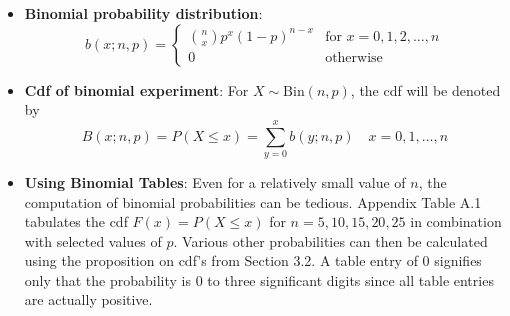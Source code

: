 \documentclass{report}
\begin{document}
\begin{itemize}
    \item \textbf{Binomial probability distribution}:
        \[
            b(x; n, p) =
            \begin{cases} 
                \binom{n}{x} p^x (1 - p)^{n - x} & \text{for } x = 0, 1, 2, \ldots, n \\
                0 & \text{otherwise}
            \end{cases}
        \]
    \item \textbf{Cdf of binomial experiment}:
        For \( X \sim \text{Bin}(n, p) \), the cdf will be denoted by
        \[
            B(x; n, p) = P(X \leq x) = \sum_{y=0}^{x} b(y; n, p) \quad x = 0, 1, \ldots, n
        \]
    \item \textbf{Using Binomial Tables}:
        Even for a relatively small value of \( n \), the computation of binomial probabilities can be tedious. Appendix Table A.1 tabulates the cdf \( F(x) = P(X \leq x) \) for \( n = 5, 10, 15, 20, 25 \) in combination with selected values of \( p \). Various other probabilities can then be calculated using the proposition on cdf’s from Section 3.2. A table entry of 0 signifies only that the probability is 0 to three significant digits since all table entries are actually positive.
        \bigbreak \noindent 
        \bigbreak \noindent 


\end{itemize}
\end{document}
